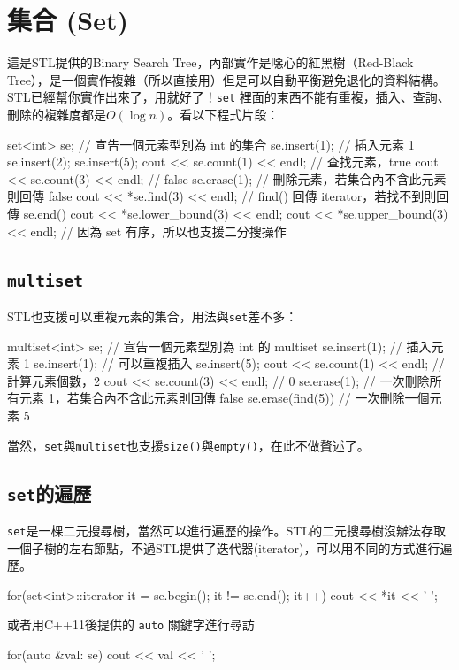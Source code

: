 \documentclass[main.tex]{subfiles}
\begin{document}
\section{集合 (Set)}
這是STL提供的Binary Search Tree，內部實作是噁心的紅黑樹（Red-Black Tree），是一個實作複雜（所以直接用）但是可以自動平衡避免退化的資料結構。STL已經幫你實作出來了，用就好了！\texttt{set} 裡面的東西不能有重複，插入、查詢、刪除的複雜度都是$O(\log n)$。看以下程式片段：
\begin{C++}
set<int> se; // 宣告一個元素型別為 int 的集合
se.insert(1); // 插入元素 1
se.insert(2);
se.insert(5);
cout << se.count(1) << endl; // 查找元素，true
cout << se.count(3) << endl; // false
se.erase(1); // 刪除元素，若集合內不含此元素則回傳 false
cout << *se.find(3) << endl;
// find() 回傳 iterator，若找不到則回傳 se.end()
cout << *se.lower_bound(3) << endl;
cout << *se.upper_bound(3) << endl;
// 因為 set 有序，所以也支援二分搜操作
\end{C++}
\subsection{\texttt{multiset}}
STL也支援可以重複元素的集合，用法與\texttt{set}差不多：
\begin{C++}
multiset<int> se; // 宣告一個元素型別為 int 的 multiset
se.insert(1); // 插入元素 1
se.insert(1); // 可以重複插入
se.insert(5);
cout << se.count(1) << endl; // 計算元素個數，2
cout << se.count(3) << endl; // 0
se.erase(1); 
// 一次刪除所有元素 1，若集合內不含此元素則回傳 false
se.erase(find(5)) // 一次刪除一個元素 5
\end{C++}
\indent\indent 當然，\texttt{set}與\texttt{multiset}也支援\texttt{size()}與\texttt{empty()}，在此不做贅述了。
\subsection{\texttt{set}的遍歷}
\texttt{set}是一棵二元搜尋樹，當然可以進行遍歷的操作。STL的二元搜尋樹沒辦法存取一個子樹的左右節點，不過STL提供了迭代器(iterator)，可以用不同的方式進行遍歷。
\begin{C++}
for(set<int>::iterator it = se.begin(); it != se.end(); it++)
    cout << *it << ' ';
\end{C++}
\indent\indent 或者用C++11後提供的 \texttt{auto} 關鍵字進行尋訪
\begin{C++}
for(auto &val: se)
    cout << val << ' ';
\end{C++}
\end{document}
